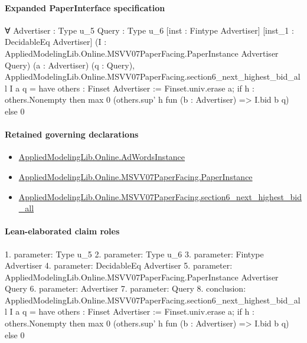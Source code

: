 \documentclass[10pt]{article}
\begin{document}
\paragraph{Expanded PaperInterface specification}
\begin{ReviewVerbatim}
∀ {Advertiser : Type u_5} {Query : Type u_6} [inst : Fintype Advertiser] [inst_1 : DecidableEq Advertiser]
  (I : AppliedModelingLib.Online.MSVV07PaperFacing.PaperInstance Advertiser Query) (a : Advertiser) (q : Query),
  AppliedModelingLib.Online.MSVV07PaperFacing.section6_next_highest_bid_all I a q =
    have others : Finset Advertiser := Finset.univ.erase a;
    if h : others.Nonempty then max 0 (others.sup' h fun (b : Advertiser) => I.bid b q) else 0
\end{ReviewVerbatim}

\paragraph{Retained governing declarations}
\begin{itemize}\raggedright
\item \hyperlink{governing-declaration-e5ce49672bf26ab1}{Applied\allowbreak{}Modeling\allowbreak{}Lib.\allowbreak{}Online.\allowbreak{}Ad\allowbreak{}Words\allowbreak{}Instance}
\item \hyperlink{governing-declaration-11907576ec71eeb5}{Applied\allowbreak{}Modeling\allowbreak{}Lib.\allowbreak{}Online.\allowbreak{}MSVV07\allowbreak{}Paper\allowbreak{}Facing.\allowbreak{}Paper\allowbreak{}Instance}
\item \hyperlink{governing-declaration-5cea0eb3c7a14423}{Applied\allowbreak{}Modeling\allowbreak{}Lib.\allowbreak{}Online.\allowbreak{}MSVV07\allowbreak{}Paper\allowbreak{}Facing.\allowbreak{}section6\_\allowbreak{}next\_\allowbreak{}highest\_\allowbreak{}bid\_\allowbreak{}all}
\end{itemize}
\paragraph{Lean-elaborated claim roles}\begin{ReviewVerbatim}
1. parameter: Type u_5
2. parameter: Type u_6
3. parameter: Fintype Advertiser
4. parameter: DecidableEq Advertiser
5. parameter: AppliedModelingLib.Online.MSVV07PaperFacing.PaperInstance Advertiser Query
6. parameter: Advertiser
7. parameter: Query
8. conclusion: AppliedModelingLib.Online.MSVV07PaperFacing.section6_next_highest_bid_all I a q =
  have others : Finset Advertiser := Finset.univ.erase a;
  if h : others.Nonempty then max 0 (others.sup' h fun (b : Advertiser) => I.bid b q) else 0
\end{ReviewVerbatim}
\end{document}
